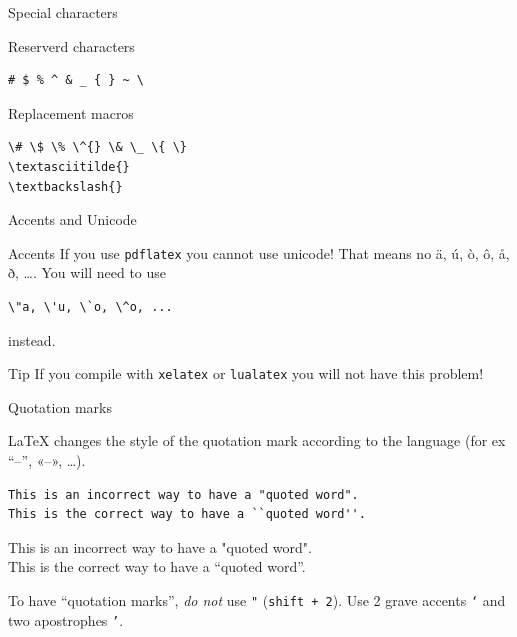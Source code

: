 \documentclass[xetex, onlymath]{beamer}
\begin{document}
\begin{frame}[fragile]{Special characters}
\begin{block}{Reserverd characters}
\LARGE
\begin{verbatim}
# $ % ^ & _ { } ~ \
\end{verbatim}
\end{block}
\begin{alertblock}{Replacement macros}
\Large
\begin{verbatim}
\# \$ \% \^{} \& \_ \{ \}
\textasciitilde{}
\textbackslash{}
\end{verbatim}
\end{alertblock}
\end{frame}
\begin{frame}[fragile]{Accents and Unicode}
  \begin{block}{Accents}
    \Large
    If you use \texttt{pdflatex} you cannot use unicode! That means no ä, ú, ò, ô, å, ð, \ldots.
    You will need to use
\begin{verbatim}
\"a, \'u, \`o, \^o, ...
\end{verbatim}
    instead.
  \end{block}
  \begin{alertblock}{Tip}
    If you compile with \texttt{xelatex} or \texttt{lualatex} you will not have this problem!
  \end{alertblock}
\end{frame}

\begin{frame}[fragile]{Quotation marks}
  \begin{block}{}
    \textrm{\LaTeX} changes the style of the quotation mark according to the language (for ex ``--'', «--», \ldots).
  \end{block}
  \begin{exampleblock}{}
    \large
\begin{lstlisting}[escapechar=!]
This is an incorrect way to have a "quoted word".
This is the correct way to have a ``quoted word''.
\end{lstlisting}
This is an incorrect way to have a "quoted word". \\
This is the correct way to have a ``quoted word''.
  \end{exampleblock}
  \begin{alertblock}{}
    \large
    To have ``quotation marks'', \emph{do not} use \texttt{"} (\texttt{shift + 2}).
    Use 2 grave accents \texttt{`} and two apostrophes \texttt{'}.
  \end{alertblock}
\end{frame}
\end{document}
